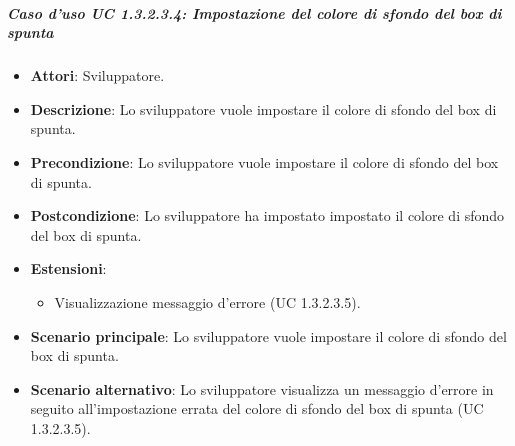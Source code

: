 \subparagraph{Caso d'uso UC 1.3.2.3.4: Impostazione del colore di sfondo del box di spunta}

\FloatBarrier
\begin{itemize}
\item\textbf{Attori}: Sviluppatore.
\item\textbf{Descrizione}: Lo sviluppatore vuole impostare il colore di sfondo del box di spunta.
\item\textbf{Precondizione}: Lo sviluppatore vuole impostare il colore di sfondo del box di spunta.
\item\textbf{Postcondizione}: Lo sviluppatore ha impostato impostato il colore di sfondo del box di spunta.
\item \textbf{Estensioni}: 
\begin{itemize}
\item Visualizzazione messaggio d'errore (UC 1.3.2.3.5).
\end{itemize}
\item\textbf{Scenario principale}: Lo sviluppatore vuole impostare il colore di sfondo del box di spunta.
\item\textbf{Scenario alternativo}: Lo sviluppatore visualizza un messaggio d'errore in seguito all'impostazione errata del colore di sfondo del box di spunta (UC 1.3.2.3.5).
\end{itemize}